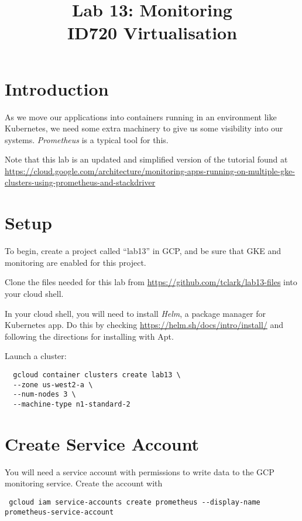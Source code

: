 \documentclass{article}
\begin{document}
\title{Lab 13: Monitoring\\ID720 Virtualisation}
\date{}
\maketitle

\section*{Introduction}
As we move our applications into containers running in an environment like Kubernetes, we need some extra machinery to give us some visibility into our systems. \emph{Prometheus} is a typical tool for this.

Note that this lab is an updated and simplified version of the tutorial found at \url{https://cloud.google.com/architecture/monitoring-apps-running-on-multiple-gke-clusters-using-prometheus-and-stackdriver} 

\section{Setup}

To begin, create a project called ``lab13'' in GCP, and be sure that GKE and monitoring are enabled for this project.

Clone the files needed for this lab from \url{https://github.com/tclark/lab13-files} into your cloud shell.

In your cloud shell, you will need to install \emph{Helm}, a package manager for Kubernetes app. Do this by checking \url{https://helm.sh/docs/intro/install/} and following the directions for installing with Apt.

Launch a cluster:

\begin{verbatim}
  gcloud container clusters create lab13 \
  --zone us-west2-a \
  --num-nodes 3 \
  --machine-type n1-standard-2
\end{verbatim}

\section{Create Service Account}
You will need a service account with permissions to write data to the GCP monitoring service. Create the account with 

\begin{verbatim}
 gcloud iam service-accounts create prometheus --display-name prometheus-service-account
\end{verbatim}
\end{document}
